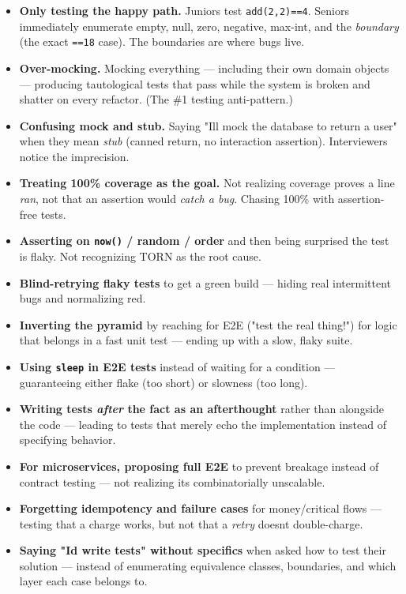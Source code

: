 \documentclass[11pt]{article}
\begin{document}
\begin{itemize}
\item
  \textbf{Only testing the happy path.} Juniors test \texttt{add(2,2)==4}. Seniors immediately enumerate empty, null, zero, negative, max-int, and the \emph{boundary} (the exact \texttt{==18} case). The boundaries are where bugs live.
\item
  \textbf{Over-mocking.} Mocking everything --- including their own domain objects --- producing tautological tests that pass while the system is broken and shatter on every refactor. (The \#1 testing anti-pattern.)
\item
  \textbf{Confusing mock and stub.} Saying "I\textquotesingle ll mock the database to return a user" when they mean \emph{stub} (canned return, no interaction assertion). Interviewers notice the imprecision.
\item
  \textbf{Treating 100\% coverage as the goal.} Not realizing coverage proves a line \emph{ran}, not that an assertion would \emph{catch a bug}. Chasing 100\% with assertion-free tests.
\item
  \textbf{Asserting on \texttt{now()} / random / order} and then being surprised the test is flaky. Not recognizing TORN as the root cause.
\item
  \textbf{Blind-retrying flaky tests} to get a green build --- hiding real intermittent bugs and normalizing red.
\item
  \textbf{Inverting the pyramid} by reaching for E2E ("test the real thing!") for logic that belongs in a fast unit test --- ending up with a slow, flaky suite.
\item
  \textbf{Using \texttt{sleep} in E2E tests} instead of waiting for a condition --- guaranteeing either flake (too short) or slowness (too long).
\item
  \textbf{Writing tests \emph{after} the fact as an afterthought} rather than alongside the code --- leading to tests that merely echo the implementation instead of specifying behavior.
\item
  \textbf{For microservices, proposing full E2E} to prevent breakage instead of contract testing --- not realizing it\textquotesingle s combinatorially unscalable.
\item
  \textbf{Forgetting idempotency and failure cases} for money/critical flows --- testing that a charge works, but not that a \emph{retry} doesn\textquotesingle t double-charge.
\item
  \textbf{Saying "I\textquotesingle d write tests" without specifics} when asked how to test their solution --- instead of enumerating equivalence classes, boundaries, and which layer each case belongs to.
\end{itemize}
\end{document}
